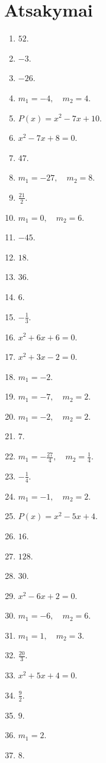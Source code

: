 \documentclass[11pt,a4paper]{article}
\begin{document}
\section*{Atsakymai}
\begingroup\small
\setlength{\baselineskip}{11pt}
\begin{enumerate}
\item \(52\).
\item \(-3\).
\item \(-26\).
\item \(m_1=-4,\quad m_2=4\).
\item \(P(x)=x^2-7x+10\).
\item \(x^2-7x+8=0\).
\item \(47\).
\item \(m_1=-27,\quad m_2=8\).
\item \(\frac{21}{2}\).
\item \(m_1=0,\quad m_2=6\).
\item \(-45\).
\item \(18\).
\item \(36\).
\item \(6\).
\item \(-\frac{1}{3}\).
\item \(x^2+6x+6=0\).
\item \(x^2+3x-2=0\).
\item \(m_1=-2\).
\item \(m_1=-7,\quad m_2=2\).
\item \(m_1=-2,\quad m_2=2\).
\item \(7\).
\item \(m_1=-\frac{27}{4},\quad m_2=\frac{1}{4}\).
\item \(-\frac{1}{4}\).
\item \(m_1=-1,\quad m_2=2\).
\item \(P(x)=x^2-5x+4\).
\item \(16\).
\item \(128\).
\item \(30\).
\item \(x^2-6x+2=0\).
\item \(m_1=-6,\quad m_2=6\).
\item \(m_1=1,\quad m_2=3\).
\item \(\frac{20}{3}\).
\item \(x^2+5x+4=0\).
\item \(\frac{9}{2}\).
\item \(9\).
\item \(m_1=2\).
\item \(8\).

\end{enumerate}
\end{document}
